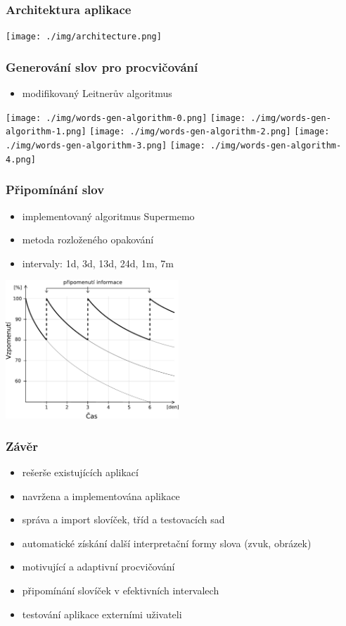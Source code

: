 \begin{frame}[t]
    \frametitle{Architektura aplikace}
    \texttt{[image: ./img/architecture.png]}
\end{frame}

\begin{frame}[t]
    \frametitle{Generování slov pro procvičování}
    \begin{itemize}
        \item modifikovaný Leitnerův algoritmus
    \end{itemize}
     {\texttt{[image: ./img/words-gen-algorithm-0.png]}}
     {\texttt{[image: ./img/words-gen-algorithm-1.png]}}
     {\texttt{[image: ./img/words-gen-algorithm-2.png]}}
     {\texttt{[image: ./img/words-gen-algorithm-3.png]}}
     {\texttt{[image: ./img/words-gen-algorithm-4.png]}}
\end{frame}

\begin{frame}[t]
    \frametitle{Připomínání slov}
    \begin{itemize}
        \item implementovaný algoritmus Supermemo
        \item metoda rozloženého opakování
        \item intervaly: 1d, 3d, 13d, 24d, 1m, 7m 
    \end{itemize}
    \begin{center}
        \includegraphics[width=6.5cm]{./img/forgetting-curve.pdf}\\
    \end{center}
\end{frame}

\begin{frame}[t]
    \frametitle{Závěr}
    \begin{itemize}[<+->]
        \item rešerše existujících aplikací 
        \item navržena a implementována aplikace
        \item správa a import slovíček, tříd a testovacích sad
        \item automatické získání další interpretační formy slova (zvuk, obrázek)
        \item motivující a adaptivní procvičování
        \item připomínání slovíček v efektivních intervalech
        \item testování aplikace externími uživateli
    \end{itemize}
\end{frame}


